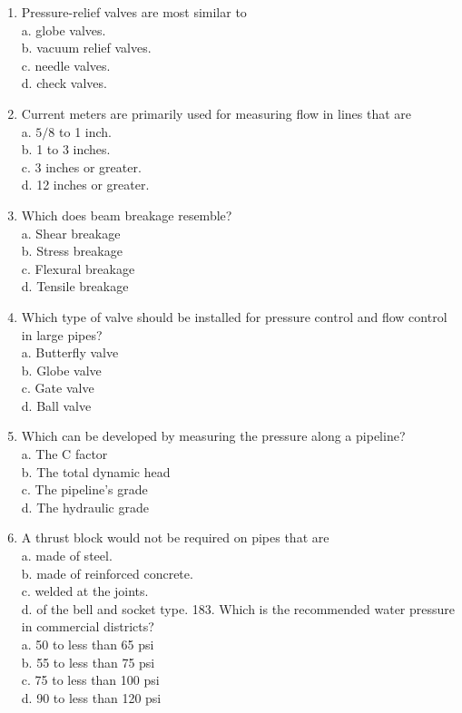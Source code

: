 \documentclass[10pt]{article}
\begin{document}
\begin{enumerate}
  \item Pressure-relief valves are most similar to\\
a. globe valves.\\
b. vacuum relief valves.\\
c. needle valves.\\
d. check valves.

  \item Current meters are primarily used for measuring flow in lines that are\\
a. $5 / 8$ to 1 inch.\\
b. 1 to 3 inches.\\
c. 3 inches or greater.\\
d. 12 inches or greater.

  \item Which does beam breakage resemble?\\
a. Shear breakage\\
b. Stress breakage\\
c. Flexural breakage\\
d. Tensile breakage

  \item Which type of valve should be installed for pressure control and flow control in large pipes?\\
a. Butterfly valve\\
b. Globe valve\\
c. Gate valve\\
d. Ball valve

  \item Which can be developed by measuring the pressure along a pipeline?\\
a. The C factor\\
b. The total dynamic head\\
c. The pipeline's grade\\
d. The hydraulic grade

  \item A thrust block would not be required on pipes that are\\
a. made of steel.\\
b. made of reinforced concrete.\\
c. welded at the joints.\\
d. of the bell and socket type. 183. Which is the recommended water pressure in commercial districts?\\
a. 50 to less than 65 psi\\
b. 55 to less than 75 psi\\
c. 75 to less than 100 psi\\
d. 90 to less than 120 psi


\end{enumerate}
\end{document}
